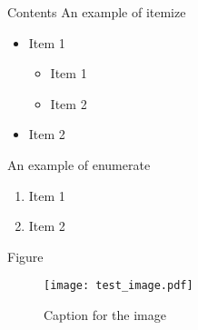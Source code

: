
\begin{frame}{Contents}
An example of itemize
\begin{itemize}
  \item Item 1
  \begin{itemize} %
    \item Item 1
    \item Item 2
  \end{itemize}
  \item Item 2
\end{itemize}
An example of enumerate
\begin{enumerate} %
  \item Item 1
  \item Item 2
\end{enumerate}
\end{frame}

\begin{frame}{Figure}
\begin{figure}[t]
\centering
\texttt{[image: test\_image.pdf]} %
\caption{Caption for the image}
\end{figure}
\end{frame}